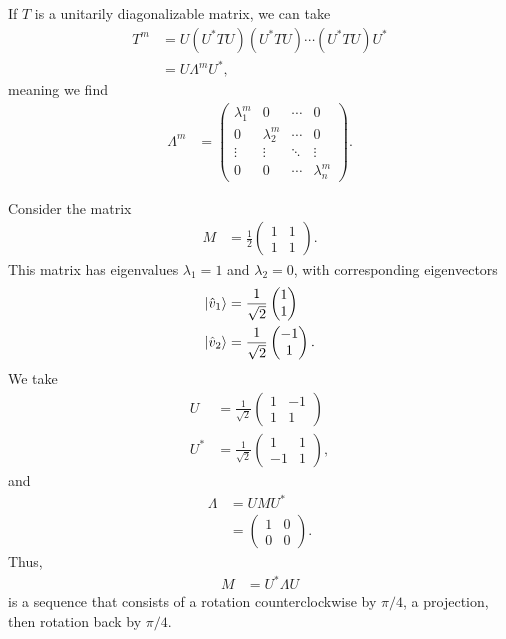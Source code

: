 \documentclass[10pt]{mypackage}
\begin{document}
\begin{example}
  \renewcommand{\arraystretch}{1.5}
If $T$ is a unitarily diagonalizable matrix, we can take
\begin{align*}
  T^{m} &= U\left(U^{\ast}TU\right)\left(U^{\ast}TU\right)\cdots \left(U^{\ast}TU\right)U^{\ast}\\
        &= U\Lambda^{m}U^{\ast},
\end{align*}
meaning we find
\begin{align*}
  \Lambda^{m} &= \begin{pmatrix}\lambda_{1}^{m} & 0 & \cdots & 0 \\ 0 & \lambda_{2}^m & \cdots & 0 \\ \vdots & \vdots & \ddots & \vdots \\ 0 & 0 & \cdots & \lambda_{n}^{m}\end{pmatrix}.
\end{align*}

\end{example}
\begin{example}
  Consider the matrix
  \begin{align*}
    M &= \frac{1}{2} \begin{pmatrix}1 & 1 \\ 1 & 1\end{pmatrix}.
  \end{align*}
  This matrix has eigenvalues $\lambda_1 = 1$ and $\lambda_2 = 0$, with corresponding eigenvectors
  \begin{align*}
    \ket{\hat{v}_1} &= \frac{1}{\sqrt{2}} \begin{pmatrix}1\\1\end{pmatrix}\\
    \ket{\hat{v}_2} &= \frac{1}{\sqrt{2}} \begin{pmatrix}-1\\1\end{pmatrix}.
  \end{align*}
  We take
  \begin{align*}
    U &= \frac{1}{\sqrt{2}} \begin{pmatrix}1 & -1 \\ 1 & 1\end{pmatrix}\\
    U^{\ast} &= \frac{1}{\sqrt{2}} \begin{pmatrix}1 & 1 \\ -1 & 1\end{pmatrix},
  \end{align*}
  and
  \begin{align*}
    \Lambda &= U M U^{\ast}\\
            &= \begin{pmatrix}1 & 0 \\ 0 & 0\end{pmatrix}.
  \end{align*}
  Thus,
  \begin{align*}
    M &= U^{\ast}\Lambda U
  \end{align*}
  is a sequence that consists of a rotation counterclockwise by $\pi/4$, a projection, then rotation back by $\pi/4$.
\end{example}
\end{document}
